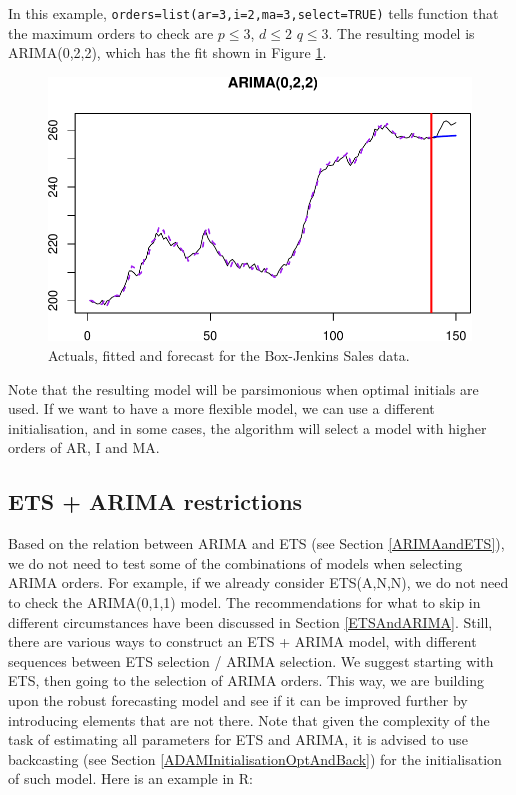 \documentclass[
]{book}
\theoremstyle{definition}
\theoremstyle{definition}
\theoremstyle{definition}
\theoremstyle{definition}
\theoremstyle{remark}
\begin{document}
In this example, \texttt{orders=list(ar=3,i=2,ma=3,select=TRUE)} tells function that the maximum orders to check are \(p\leq 3\), \(d\leq 2\) \(q\leq 3\). The resulting model is ARIMA(0,2,2), which has the fit shown in Figure \ref{fig:adamARIMAModelFitExample}.

\begin{figure}
\centering
\includegraphics{Svetunkov--2022----ADAM_files/figure-latex/adamARIMAModelFitExample-1.pdf}
\caption{\label{fig:adamARIMAModelFitExample}Actuals, fitted and forecast for the Box-Jenkins Sales data.}
\end{figure}

Note that the resulting model will be parsimonious when optimal initials are used. If we want to have a more flexible model, we can use a different initialisation, and in some cases, the algorithm will select a model with higher orders of AR, I and MA.

\hypertarget{ets-arima-restrictions}{%
\subsection{ETS + ARIMA restrictions}\label{ets-arima-restrictions}}

Based on the relation between ARIMA and ETS (see Section \ref{ARIMAandETS}), we do not need to test some of the combinations of models when selecting ARIMA orders. For example, if we already consider ETS(A,N,N), we do not need to check the ARIMA(0,1,1) model. The recommendations for what to skip in different circumstances have been discussed in Section \ref{ETSAndARIMA}. Still, there are various ways to construct an ETS + ARIMA model, with different sequences between ETS selection / ARIMA selection. We suggest starting with ETS, then going to the selection of ARIMA orders. This way, we are building upon the robust forecasting model and see if it can be improved further by introducing elements that are not there. Note that given the complexity of the task of estimating all parameters for ETS and ARIMA, it is advised to use backcasting (see Section \ref{ADAMInitialisationOptAndBack}) for the initialisation of such model. Here is an example in R:
\end{document}
